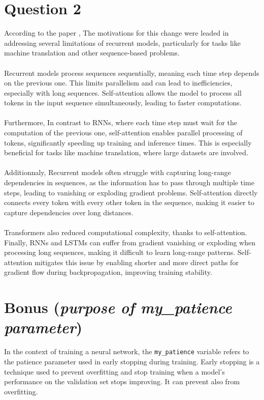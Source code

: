 \documentclass[a4paper]{article}
\begin{document}
\section{Question 2}
\noindent
According to the paper \cite{vaswani2023attentionneed}, The motivations for this
change were leaded in addressing several limitations of recurrent models, particularly for
tasks like machine translation and other sequence-based problems.
\\
\\
\noindent
Recurrent models process sequences sequentially, meaning each time step depends on the previous
one. This limits parallelism and can lead to inefficiencies, especially with long sequences.
Self-attention allows the model to process all tokens in the input sequence simultaneously,
leading to faster computations.
\\
\\
\noindent
Furthermore, In contrast to RNNs, where each time step must wait for the computation
of the previous one, self-attention enables parallel processing of tokens, significantly
speeding up training and inference times. This is especially beneficial for tasks like
machine translation, where large datasets are involved.
\\
\\
\noindent
Additionnaly, Recurrent models often struggle with capturing long-range
dependencies in sequences, as the information has to pass through multiple
time steps, leading to vanishing or exploding gradient problems. Self-attention
directly connects every token with every other token in the sequence, making it easier
to capture dependencies over long distances.
\\
\\
\noindent
Transformers also reduced computational complexity, thanks to self-attention. Finally,
RNNs and LSTMs can suffer from gradient vanishing or exploding when processing long sequences,
making it difficult to learn long-range patterns. Self-attention mitigates this issue by
enabling shorter and more direct paths for gradient flow during backpropagation, improving
training stability.


\section{Bonus (\textit{purpose of my\_patience parameter})}
\noindent
In the context of training a neural network, the \texttt{my\_patience} variable refers to
the patience parameter used in early stopping during training. Early stopping is a
technique used to prevent overfitting and stop training when a model’s performance on
the validation set stops improving. It can prevent also from overfitting.
\end{document}
